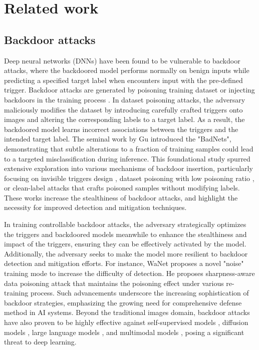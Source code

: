 \section{Related work\label{sec2}}
\subsection{Backdoor attacks}
Deep neural networks (DNNs) have been found to be vulnerable to backdoor attacks, where the backdoored model performs normally on benign inputs while predicting a specified target label when encounters input with the pre-defined trigger. Backdoor attacks are generated by poisoning training dataset \cite{gu2019badnets,chen2017targeted,zeng2021rethinking,li2021invisible} or injecting backdoors in the training process \cite{nguyen2020input,nguyen2021wanet,liang2024badclip,foret2021sharpnessaware}.
In dataset poisoning attacks, the adversary maliciously modifies the dataset by introducing carefully crafted triggers onto images and altering the corresponding labels to a target label. As a result, the backdoored model learns incorrect associations between the triggers and the intended target label.
The seminal work by Gu \etal \cite{gu2019badnets} introduced the "BadNets", demonstrating that subtle alterations to a fraction of training samples could lead to a targeted misclassification during inference. This foundational study spurred extensive exploration into various mechanisms of backdoor insertion, particularly focusing on invisible triggers design \cite{li2021invisible,zeng2021rethinking}, dataset poisoning with low poisoning ratio \cite{song2024wpda,zhu2023boosting}, or clean-label attacks \cite{gao2021clean,shafahi2018poison,barni2019new} that crafts poisoned samples without modifying labels. These works increase the stealthiness of backdoor attacks, and highlight the necessity for improved detection and mitigation techniques. 

In training controllable backdoor attacks, the adversary strategically optimizes the triggers and backdoored models meanwhile to enhance the stealthiness and impact of the triggers, ensuring they can be effectively activated by the model. Additionally, the adversary seeks to make the model more resilient to backdoor detection and mitigation efforts.
For instance, WaNet \cite{nguyen2021wanet} proposes a novel "noise" training mode to increase the difficulty of detection. He \etal \cite{he2024sharpnessaware} proposes sharpness-aware data poisoning
attack that maintains the poisoning effect under various re-training process. Such advancements underscore the increasing sophistication of backdoor strategies, emphasizing the growing need for comprehensive defense method in AI systems.
Beyond the traditional images domain, backdoor attacks have also proven to be highly effective against self-supervised models \cite{jia2022badencoder,li2023embarrassingly}, diffusion models \cite{chou2024villandiffusion,chou2023backdoor}, large language models \cite{yang2024watch,li2024backdoorllm}, and multimodal models \cite{liang2024badclip,bai2024badclip}, posing a significant threat to deep learning.

